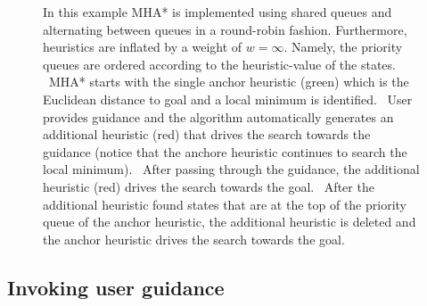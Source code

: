 \documentclass[conference]{IEEEtran}
\begin{document}
\begin{figure}[t]
{    %
    In this example MHA* is implemented using shared queues and alternating between queues in a round-robin fashion. Furthermore, heuristics are inflated by a weight of $w=\infty$. Namely, the priority queues are ordered according to the heuristic-value of the states.
	~MHA* starts with the single anchor heuristic (green) which is the Euclidean distance to goal and a local minimum is identified.
	~User provides guidance and the algorithm automatically generates an additional heuristic (red) that drives the search towards the guidance (notice that the anchore heuristic continues to search the local minimum).
	~After passing through the guidance, the additional heuristic (red) drives the search towards the goal.
	~After the additional heuristic found states that are at the top of the priority queue of the anchor heuristic, the additional heuristic is deleted and the anchor heuristic drives the search towards the goal.
  }%
  \label{fig:filmstrip-dynamic_heuristic}%
  \vspace{-2.5mm}
\end{figure}


\subsection{Invoking user guidance}
\label{sec:q1}
\end{document}
